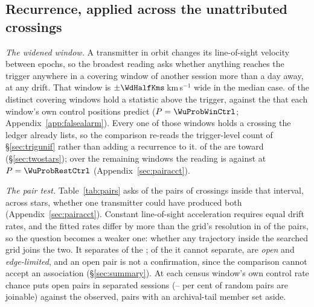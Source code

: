 \subsection{Recurrence, applied across the unattributed crossings}
\label{sec:etacrv}

\emph{The widened window.} A transmitter in orbit changes its line-of-sight
velocity between epochs, so the broadest reading asks whether anything reaches
the trigger anywhere in a covering window of another session more than a day
away, at any drift. That window is $\pm\WdHalfKms$\,km\,s$^{-1}$ wide in the median
case. \WuNWinExc{}
of the \WuNWin{} distinct covering windows hold a statistic above the
trigger, against the \WuExpWinCtrl{} that each window's own control positions
predict ($P=\WuProbWinCtrl$; Appendix~\ref{app:falsealarm}). Every one of those windows
holds a crossing the ledger already lists, so the comparison re-reads the
trigger-level count of \S\ref{sec:trigunif} rather than adding a recurrence to it. \WuNWinExcTwo{} of the \WuNWinExc{} are
toward \WuTwoStars{}
(\S\ref{sec:twostars}); over the remaining \WuNWinRest{} windows the reading
is \WuNWinRestExc{} against \WuExpRestCtrl{} at $P=\WuProbRestCtrl$
(Appendix~\ref{sec:pairacct}).

\emph{The pair test.} Table~\ref{tab:pairs} asks of the \TjNPair{} pairs of
crossings inside that interval, across \TjNStarPair{} stars, whether one
transmitter could have produced both (Appendix~\ref{sec:pairacct}). Constant
line-of-sight acceleration requires equal drift rates, and the fitted rates
differ by more than the grid's resolution in \TjNUneqDrift{} of the
\TjNPair{} pairs, so the question becomes a weaker one: whether any trajectory inside the searched grid
joins the two. It separates
\TjNExcl{} of the \TjNPair{}; of the \TjNOpen{} it cannot separate, \TjNOpenPlain{}
are \emph{open} and \TjNPairEdge{} \emph{edge-limited}, and an open pair is not a
confirmation, since the comparison cannot accept an association
(\S\ref{sec:summary}). At each census window's own control rate chance puts
\OpExpSepRange{} open pairs in separated sessions
(\OpJoinPctLo--\OpJoinPctHi{} per cent of random pairs are joinable) against
the \OpObsSep{} observed, pairs with an archival-tail member set aside.

